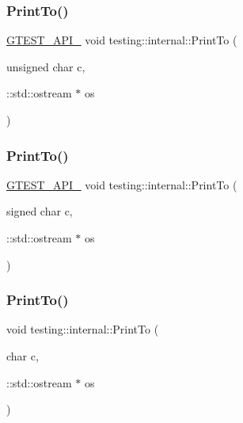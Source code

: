 \mbox{\label{namespacetesting_1_1internal_aa7e70a85d66f0c109e3e69629ef577f2}} 
\subsubsection{\texorpdfstring{PrintTo()}{PrintTo()}\hspace{0.1cm}{\footnotesize\ttfamily [2/16]}}
{\footnotesize\ttfamily \mbox{\hyperlink{gtest-port_8h_aa73be6f0ba4a7456180a94904ce17790}{G\+T\+E\+S\+T\+\_\+\+A\+P\+I\+\_\+}} void testing\+::internal\+::\+Print\+To (\begin{DoxyParamCaption}\item[{unsigned char}]{c,  }\item[{\+::std\+::ostream $\ast$}]{os }\end{DoxyParamCaption})}

\mbox{\label{namespacetesting_1_1internal_abf6c518b437569187c1218166c702807}} 
\subsubsection{\texorpdfstring{PrintTo()}{PrintTo()}\hspace{0.1cm}{\footnotesize\ttfamily [3/16]}}
{\footnotesize\ttfamily \mbox{\hyperlink{gtest-port_8h_aa73be6f0ba4a7456180a94904ce17790}{G\+T\+E\+S\+T\+\_\+\+A\+P\+I\+\_\+}} void testing\+::internal\+::\+Print\+To (\begin{DoxyParamCaption}\item[{signed char}]{c,  }\item[{\+::std\+::ostream $\ast$}]{os }\end{DoxyParamCaption})}

\mbox{\label{namespacetesting_1_1internal_a476bd3d411d4f129620aaf8999c257c0}} 
\subsubsection{\texorpdfstring{PrintTo()}{PrintTo()}\hspace{0.1cm}{\footnotesize\ttfamily [4/16]}}
{\footnotesize\ttfamily void testing\+::internal\+::\+Print\+To (\begin{DoxyParamCaption}\item[{char}]{c,  }\item[{\+::std\+::ostream $\ast$}]{os }\end{DoxyParamCaption})\hspace{0.3cm}{\ttfamily [inline]}}

